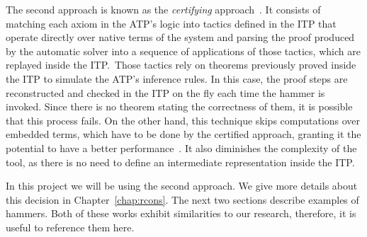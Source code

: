 The second approach is known as the \textit{certifying} approach~\cite{snipe}. It consists of matching
each axiom in the ATP's logic into tactics
defined in the ITP that operate directly over native terms of the system and parsing
the proof produced by the automatic solver into a sequence of applications
of those tactics, which are replayed inside the ITP.\
Those tactics rely on theorems previously proved inside the ITP to simulate the ATP's inference rules.
In this case, the proof steps are reconstructed and checked in the ITP on the
fly each time the hammer is invoked. Since there is no theorem stating the
correctness of them, it is possible that this process fails.
On the other hand,
this technique skips computations over embedded terms, which have to be done by the
certified approach, granting it the potential to have a better
performance~\cite{ringLean}. It also diminishes the complexity of the tool, as there is no need to
define an intermediate representation inside the ITP.\

In this project we will be using the second approach. We give more details about this
decision in Chapter~\ref{chap:rcons}. The next two sections describe examples of hammers.
Both of these works exhibit similarities to our research, therefore, it is useful to reference them here.
